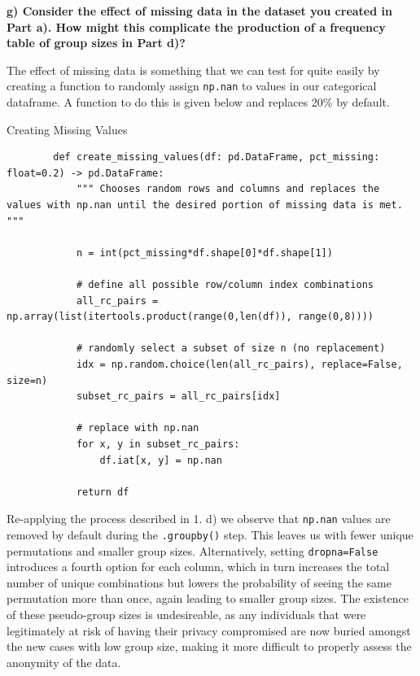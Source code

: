 \documentclass{article}
\begin{document}
\vspace{\baselineskip}

\textbf{g) Consider the effect of missing data in the dataset you created in Part a). How might this complicate the production of a frequency table of group sizes in Part d)?} 

\vspace{\baselineskip}

The effect of missing data is something that we can test for quite easily by creating a function to randomly assign \texttt{np.nan} to values in our categorical dataframe. A function to do this is given below and replaces 20\% by default. 

\begin{mybox}[colbacktitle=green]{Creating Missing Values}
    \begin{verbatim}
        def create_missing_values(df: pd.DataFrame, pct_missing: float=0.2) -> pd.DataFrame:
            """ Chooses random rows and columns and replaces the values with np.nan until the desired portion of missing data is met. """

            n = int(pct_missing*df.shape[0]*df.shape[1])

            # define all possible row/column index combinations
            all_rc_pairs = np.array(list(itertools.product(range(0,len(df)), range(0,8))))

            # randomly select a subset of size n (no replacement)
            idx = np.random.choice(len(all_rc_pairs), replace=False, size=n)
            subset_rc_pairs = all_rc_pairs[idx]

            # replace with np.nan
            for x, y in subset_rc_pairs:
                df.iat[x, y] = np.nan

            return df
    \end{verbatim}
\end{mybox}

Re-applying the process described in 1. d) we observe that \texttt{np.nan} values are removed by default during the \texttt{.groupby()} step. This leaves us with fewer unique permutations and smaller group sizes. Alternatively, setting \texttt{dropna=False} introduces a fourth option for each column, which in turn increases the total number of unique combinations but lowers the probability of seeing the same permutation more than once, again leading to smaller group sizes. 
The existence of these pseudo-group sizes is undesireable, as any individuals that were legitimately at risk of having their privacy compromised are now buried amongst the new cases with low group size, making it more difficult to properly assess the anonymity of the data. 
\end{document}
